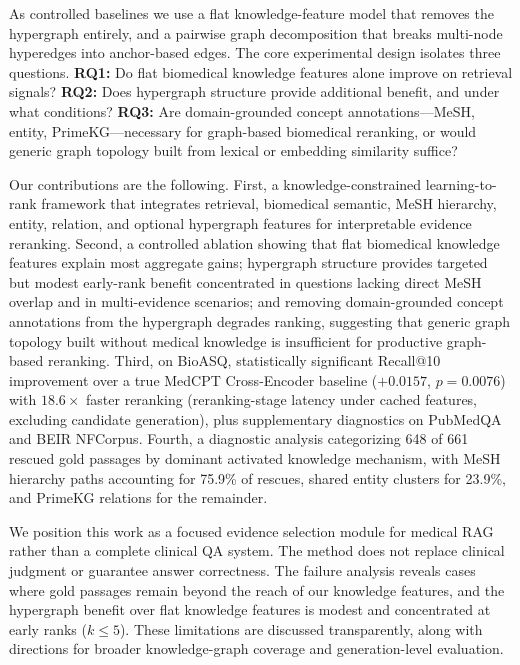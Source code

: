 As controlled baselines we use a flat knowledge-feature model that removes the hypergraph entirely, and a pairwise graph decomposition that breaks multi-node hyperedges into anchor-based edges. The core experimental design isolates three questions. \textbf{RQ1:} Do flat biomedical knowledge features alone improve on retrieval signals? \textbf{RQ2:} Does hypergraph structure provide additional benefit, and under what conditions? \textbf{RQ3:} Are domain-grounded concept annotations---MeSH, entity, PrimeKG---necessary for graph-based biomedical reranking, or would generic graph topology built from lexical or embedding similarity suffice?

Our contributions are the following. First, a knowledge-constrained learning-to-rank framework that integrates retrieval, biomedical semantic, MeSH hierarchy, entity, relation, and optional hypergraph features for interpretable evidence reranking. Second, a controlled ablation showing that flat biomedical knowledge features explain most aggregate gains; hypergraph structure provides targeted but modest early-rank benefit concentrated in questions lacking direct MeSH overlap and in multi-evidence scenarios; and removing domain-grounded concept annotations from the hypergraph degrades ranking, suggesting that generic graph topology built without medical knowledge is insufficient for productive graph-based reranking. Third, on BioASQ, statistically significant Recall@10 improvement over a true MedCPT Cross-Encoder baseline ($+0.0157$, $p=0.0076$) with $18.6\times$ faster reranking (reranking-stage latency under cached features, excluding candidate generation), plus supplementary diagnostics on PubMedQA and BEIR NFCorpus. Fourth, a diagnostic analysis categorizing 648 of 661 rescued gold passages by dominant activated knowledge mechanism, with MeSH hierarchy paths accounting for 75.9\% of rescues, shared entity clusters for 23.9\%, and PrimeKG relations for the remainder.

We position this work as a focused evidence selection module for medical RAG rather than a complete clinical QA system. The method does not replace clinical judgment or guarantee answer correctness. The failure analysis reveals cases where gold passages remain beyond the reach of our knowledge features, and the hypergraph benefit over flat knowledge features is modest and concentrated at early ranks ($k \leq 5$). These limitations are discussed transparently, along with directions for broader knowledge-graph coverage and generation-level evaluation.
